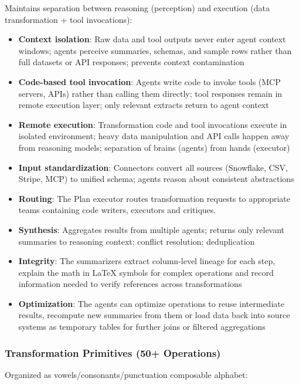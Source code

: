 \documentclass[sigconf]{acmart}
\begin{document}
Maintains separation between reasoning (perception) and execution (data transformation + tool invocations):

\begin{itemize}
  \item \textbf{Context isolation}: Raw data and tool outputs never enter agent context windows; agents perceive summaries, schemas, and sample rows rather than full datasets or API responses; prevents context contamination
  \item \textbf{Code-based tool invocation}: Agents write code to invoke tools (MCP servers, APIs) rather than calling them directly; tool responses remain in remote execution layer; only relevant extracts return to agent context
  \item \textbf{Remote execution}: Transformation code and tool invocations execute in isolated environment; heavy data manipulation and API calls happen away from reasoning models; separation of brains (agents) from hands (executor)
  \item \textbf{Input standardization}: Connectors convert all sources (Snowflake, CSV, Stripe, MCP) to unified schema; agents reason about consistent abstractions
  \item \textbf{Routing}: The Plan executor routes transformation requests to appropriate teams containing code writers, executors and critiques.
  \item \textbf{Synthesis}: Aggregates results from multiple agents; returns only relevant summaries to reasoning context; conflict resolution; deduplication
  \item \textbf{Integrity}: The summarizers extract column-level lineage for each step, explain the math in LaTeX symbols for complex operations and record information needed to verify references across transformations
  \item \textbf{Optimization}: The agents can optimize operations to reuse intermediate results, recompute new summaries from them or load data back into source systems as temporary tables for further joins or filtered aggregations
\end{itemize}

\subsubsection{Transformation Primitives (50+ Operations)}

Organized as vowels/consonants/punctuation composable alphabet:
\end{document}
